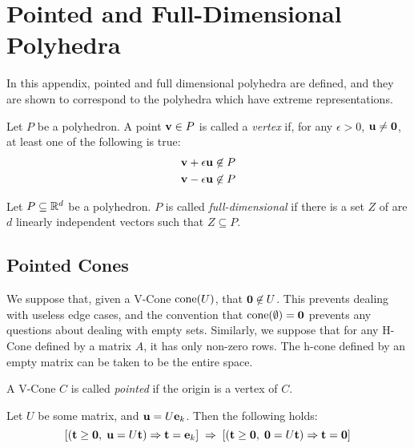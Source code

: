 
\chapter{Pointed and Full-Dimensional Polyhedra}

In this appendix, pointed and full dimensional polyhedra are defined, and they are shown to correspond to the polyhedra which have extreme representations.

\begin{Def}[Vertex]
	Let $P$ be a polyhedron.  A point $\mathbf{v} \in P$ is called a \textit{vertex} if, for any $\epsilon > 0$, $\mathbf{u} \neq \mathbf{0}$, at least one of the following is true:
	\begin{align*}
		\mathbf{v} + \epsilon\mathbf{u} \not\in P \\
		\mathbf{v} - \epsilon\mathbf{u} \not\in P \\
	\end{align*}
\end{Def}

\begin{Def}
	Let $P \subseteq \mathbb{R}^d$ be a polyhedron.  $P$ is called \textit{full-dimensional} if there is a set $Z$ of are $d$ linearly independent vectors such that $Z \subseteq P$.
\end{Def}

\section{Pointed Cones}

We suppose that, given a V-Cone $\operatorname{cone}(U)$, that $\mathbf{0}\not\in U$.  This prevents dealing with useless edge cases, and the convention that $\operatorname{cone}(\emptyset) = \mathbf{0}$ prevents any questions about dealing with empty sets.  Similarly, we suppose that for any H-Cone defined by a matrix $A$, it has only non-zero rows.  The h-cone defined by an empty matrix can be taken to be the entire space.

\begin{Def}
	A V-Cone $C$ is called \textit{pointed} if the origin is a vertex of $C$.
\end{Def}

\begin{Lemma}\label{extreme_independence}
	Let $U$ be some matrix, and $\mathbf{u} = U\mathbf{e}_k$.  Then the following holds:
	\[[(\mathbf{t}\geq\mathbf{0},\; \mathbf{u} = U\mathbf{t}) \Rightarrow \mathbf{t}=\mathbf{e}_k] \;\Rightarrow\;
		[(\mathbf{t}\geq\mathbf{0},\;\mathbf{0}=U\mathbf{t}) \Rightarrow \mathbf{t}=\mathbf{0}]\]
\end{Lemma}

